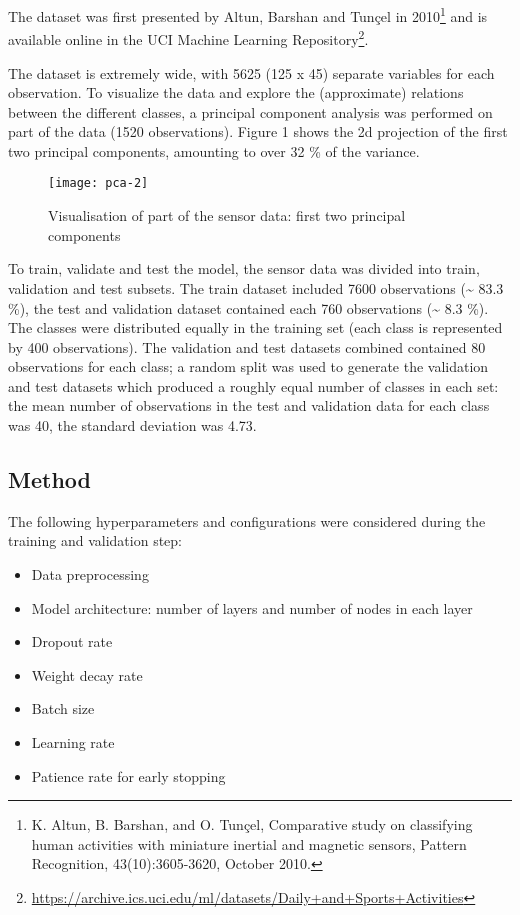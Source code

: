 \documentclass[]{article}
\providecommand{\tightlist}{%
  \setlength{\itemsep}{0pt}\setlength{\parskip}{0pt}}
\let\rmarkdownfootnote\footnote%
\def\footnote{\protect\rmarkdownfootnote}
\begin{document}
The dataset was first presented by Altun, Barshan and Tunçel in
2010\footnote{K. Altun, B. Barshan, and O. Tunçel, Comparative study on
  classifying human activities with miniature inertial and magnetic
  sensors, Pattern Recognition, 43(10):3605-3620, October 2010.} and is
available online in the UCI Machine Learning Repository\footnote{\url{https://archive.ics.uci.edu/ml/datasets/Daily+and+Sports+Activities}}.

The dataset is extremely wide, with 5625 (125 x 45) separate variables
for each observation. To visualize the data and explore the
(approximate) relations between the different classes, a principal
component analysis was performed on part of the data (1520
observations). Figure 1 shows the 2d projection of the first two
principal components, amounting to over 32 \% of the variance.

\begin{figure}

{\centering \texttt{[image: pca-2]} 

}

\caption{Visualisation of part of the sensor data: first two principal components}\label{fig:unnamed-chunk-1}
\end{figure}

To train, validate and test the model, the sensor data was divided into
train, validation and test subsets. The train dataset included 7600
observations (\textasciitilde{} 83.3 \%), the test and validation
dataset contained each 760 observations (\textasciitilde{} 8.3 \%). The
classes were distributed equally in the training set (each class is
represented by 400 observations). The validation and test datasets
combined contained 80 observations for each class; a random split was
used to generate the validation and test datasets which produced a
roughly equal number of classes in each set: the mean number of
observations in the test and validation data for each class was 40, the
standard deviation was 4.73.

\hypertarget{method}{%
\subsection{Method}\label{method}}

The following hyperparameters and configurations were considered during
the training and validation step:

\begin{itemize}
\tightlist
\item
  Data preprocessing
\item
  Model architecture: number of layers and number of nodes in each layer
\item
  Dropout rate
\item
  Weight decay rate
\item
  Batch size
\item
  Learning rate
\item
  Patience rate for early stopping
\end{itemize}
\end{document}
